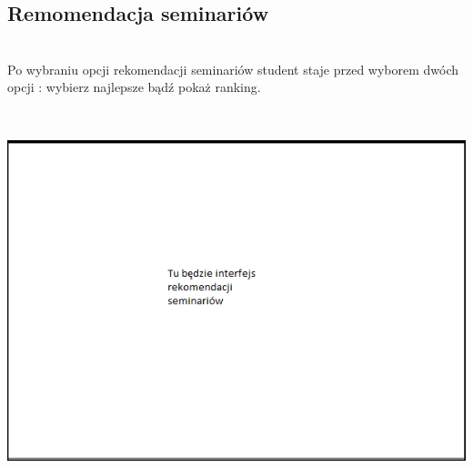 \documentclass[licencjacka]{pracamgr}
\begin{document}
\subsection{Remomendacja seminariów}
~\\ \indent
Po wybraniu opcji rekomendacji seminariów student staje przed wyborem dwóch opcji : wybierz najlepsze bądź pokaż ranking. \par 
~\\
\begin{minipage}{\linewidth}
	\centering
           \includegraphics[scale=0.7]{reksem.png}
\end{minipage} \\ 
\end{document}

